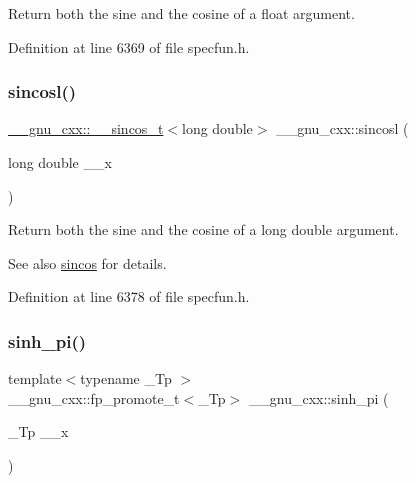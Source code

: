 Return both the sine and the cosine of a {\ttfamily float} argument. 

Definition at line 6369 of file specfun.\+h.

\mbox{\label{group__gnu__math__spec__func_ga96a7222e47d430a228973658ca9f6f35}} 
\subsubsection{\texorpdfstring{sincosl()}{sincosl()}}
{\footnotesize\ttfamily \hyperlink{struct____gnu__cxx_1_1____sincos__t}{\+\_\+\+\_\+gnu\+\_\+cxx\+::\+\_\+\+\_\+sincos\+\_\+t}$<$long double$>$ \+\_\+\+\_\+gnu\+\_\+cxx\+::sincosl (\begin{DoxyParamCaption}\item[{long double}]{\+\_\+\+\_\+x }\end{DoxyParamCaption})\hspace{0.3cm}{\ttfamily [inline]}}

Return both the sine and the cosine of a {\ttfamily  long double } argument.

\begin{DoxySeeAlso}{See also}
\hyperlink{group__gnu__math__spec__func_ga8041c24b528475bcf8a4178e484652a3}{sincos} for details. 
\end{DoxySeeAlso}


Definition at line 6378 of file specfun.\+h.

\mbox{\label{group__gnu__math__spec__func_gade43453b87b6b38c05b3fcce40870542}} 
\subsubsection{\texorpdfstring{sinh\+\_\+pi()}{sinh\_pi()}}
{\footnotesize\ttfamily template$<$typename \+\_\+\+Tp $>$ \\
\+\_\+\+\_\+gnu\+\_\+cxx\+::fp\+\_\+promote\+\_\+t$<$\+\_\+\+Tp$>$ \+\_\+\+\_\+gnu\+\_\+cxx\+::sinh\+\_\+pi (\begin{DoxyParamCaption}\item[{\+\_\+\+Tp}]{\+\_\+\+\_\+x }\end{DoxyParamCaption})\hspace{0.3cm}{\ttfamily [inline]}}

